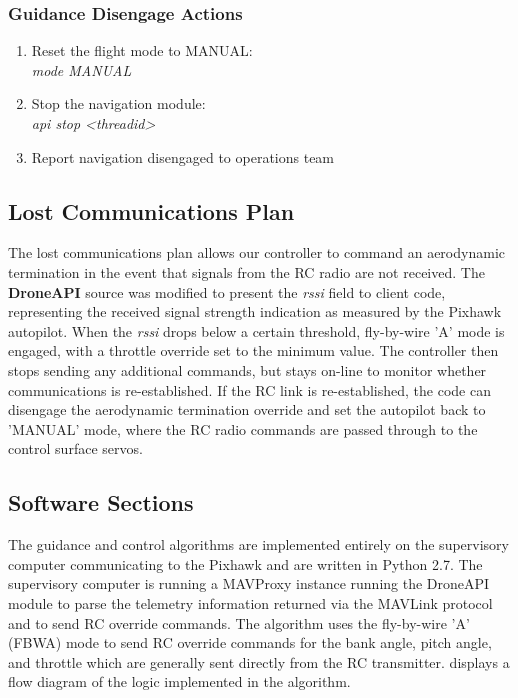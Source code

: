 \documentclass{aiaa}
\begin{document}
\subsubsection{Guidance Disengage Actions}
\begin{enumerate}
	\item Reset the flight mode to MANUAL: \\
	\textit{mode MANUAL}
	\item Stop the navigation module: \\
	\textit{api stop \textless threadid\textgreater}
	\item Report navigation disengaged to operations team
\end{enumerate}

\subsection{Lost Communications Plan}
The lost communications plan allows our controller to command an aerodynamic termination in the event that signals from the RC radio are not received. The \textbf{DroneAPI} source was modified to present the \textit{rssi} field to client code, representing the received signal strength indication as measured by the Pixhawk autopilot. When the \textit{rssi} drops below a certain threshold, fly-by-wire 'A' mode is engaged, with a throttle override set to the minimum value. The controller then stops sending any additional commands, but stays on-line to monitor whether communications is re-established. If the RC link is re-established, the code can disengage the aerodynamic termination override and set the autopilot back to 'MANUAL' mode, where the RC radio commands are passed through to the control surface servos.
\subsection{Software Sections}

The guidance and control algorithms are implemented entirely on the supervisory computer communicating to the Pixhawk and are written in Python 2.7. The supervisory computer is running a MAVProxy instance running the DroneAPI module to parse the telemetry information returned via the MAVLink protocol and to send RC override commands. The algorithm uses the fly-by-wire 'A' (FBWA) mode to send RC override commands for the bank angle, pitch angle, and throttle which are generally sent directly from the RC transmitter.  displays a flow diagram of the logic implemented in the algorithm. 
\end{document}
